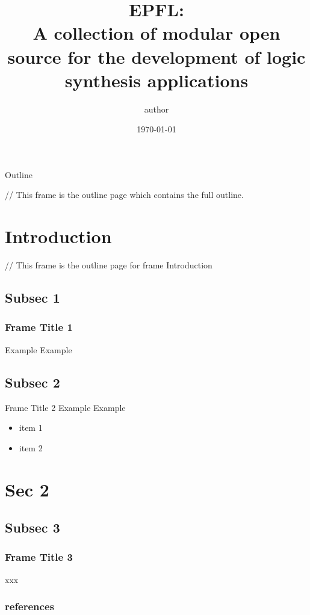 \documentclass[aspectratio=1610]{beamer}
\title{EPFL: \\ A collection of modular open source for the development of logic synthesis applications}
\author{author}
\date\today
\begin{document}
\begin{frame}[plain]
  \titlepage
\end{frame}


\begin{frame}{Outline}
  \tableofcontents

  // This frame is the outline page which contains the full outline.
  \end{frame}

\section{Introduction}

\begin{frame}
  \tableofcontents[currentsection, subsectionstyle=show/show/hide]

  // This frame is the outline page for frame Introduction
\end{frame}


\subsection {Subsec 1}
\begin{frame}
  \frametitle{Frame Title 1}
  Example Example
\end{frame}


\subsection {Subsec 2}
\begin{frame}{Frame Title 2}
  Example Example\cite{bagaev_vdjdb_2020}

\begin{itemize}
    \item item 1
    \item item 2
\end{itemize}

\end{frame}


\section {Sec 2}

\begin{frame}
  \tableofcontents[currentsection, subsectionstyle=show/show/hide]
\end{frame}

\subsection {Subsec 3}
\begin{frame}
  \frametitle{Frame Title 3}
xxx
\end{frame}
\begin{frame}
	\frametitle{references}
	\nocite{*}%
	\printbibliography
\end{frame}
\end{document}
